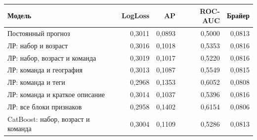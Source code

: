 \begin{tabular}{@{}>{\raggedright\arraybackslash}p{7.1cm}rrrr@{}}
\toprule
Модель & LogLoss & AP & ROC-AUC & Брайер \\
\midrule
Постоянный прогноз & 0,3011 & 0,0893 & 0,5000 & 0,0813 \\
ЛР: набор и возраст & 0,3016 & 0,1018 & 0,5353 & 0,0816 \\
ЛР: набор, возраст и команда & 0,3019 & 0,1017 & 0,5220 & 0,0816 \\
ЛР: команда и география & 0,3013 & 0,1087 & 0,5549 & 0,0815 \\
ЛР: команда и теги & 0,2968 & 0,1353 & 0,6052 & 0,0808 \\
ЛР: команда и краткое описание & 0,3014 & 0,1037 & 0,5396 & 0,0816 \\
ЛР: все блоки признаков & 0,2958 & 0,1402 & 0,6154 & 0,0806 \\
CatBoost: набор, возраст и команда & 0,3004 & 0,1109 & 0,5286 & 0,0813 \\
\bottomrule
\end{tabular}

